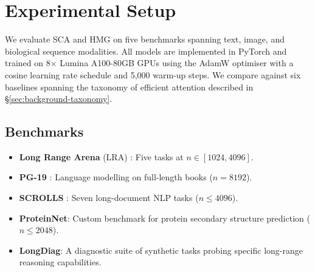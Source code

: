 \section{Experimental Setup}

We evaluate SCA and HMG on five benchmarks spanning text, image, and biological
sequence modalities. All models are implemented in PyTorch and trained on 8$\times$
Lumina A100-80GB GPUs using the AdamW optimiser \cite{loshchilov2019decoupled} with
a cosine learning rate schedule and 5,000 warm-up steps. We compare against six
baselines spanning the taxonomy of efficient attention described in
\S\ref{sec:background-taxonomy}.

\subsection{Benchmarks}

\begin{itemize}
  \item \textbf{Long Range Arena} (LRA) \cite{tay2021long}: Five tasks at
    $n \in [1024, 4096]$.
  \item \textbf{PG-19} \cite{rae2019compressive}: Language modelling on full-length
    books ($n = 8192$).
  \item \textbf{SCROLLS} \cite{shaham2022scrolls}: Seven long-document NLP tasks
    ($n \leq 4096$).
  \item \textbf{ProteinNet}: Custom benchmark for protein secondary structure prediction
    ($n \leq 2048$).
  \item \textbf{LongDiag}: A diagnostic suite of synthetic tasks probing specific
    long-range reasoning capabilities.
\end{itemize}
